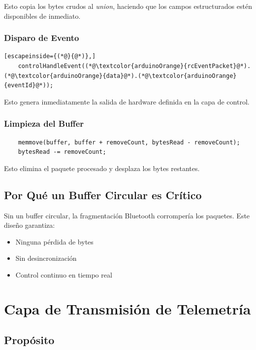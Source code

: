 \documentclass[12pt,a4paper]{article}
\begin{document}
Esto copia los bytes crudos al \textit{union}, haciendo que los campos
estructurados estén disponibles de inmediato.

\subsubsection{Disparo de Evento}

\begin{lstlisting}[escapeinside={(*@}{@*)},]
	controlHandleEvent((*@\textcolor{arduinoOrange}{rcEventPacket}@*).(*@\textcolor{arduinoOrange}{data}@*).(*@\textcolor{arduinoOrange}{eventId}@*));
\end{lstlisting}

Esto genera inmediatamente la salida de hardware definida en la capa de control.

\subsubsection{Limpieza del Buffer}

\begin{lstlisting}
	memmove(buffer, buffer + removeCount, bytesRead - removeCount);
	bytesRead -= removeCount;
\end{lstlisting}

Esto elimina el paquete procesado y desplaza los bytes restantes.

\subsection{Por Qué un Buffer Circular es Crítico}

Sin un buffer circular, la fragmentación Bluetooth corrompería los paquetes.
Este diseño garantiza:

\begin{itemize}
	\item Ninguna pérdida de bytes
	\item Sin desincronización
	\item Control continuo en tiempo real
\end{itemize}

\section{Capa de Transmisión de Telemetría}

\subsection{Propósito}
\end{document}
